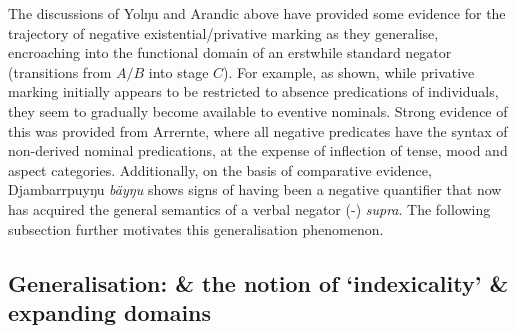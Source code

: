 \documentclass[usenames,dvipsnames,11pt]{article}
\begin{document}
{The discussions of Yolŋu and Arandic above have provided some evidence for the trajectory of negative existential/privative marking as they generalise, encroaching into the functional domain of an erstwhile standard negator (transitions from $A/B$ into stage $C$). For example, as shown, while privative marking initially appears to be restricted to absence predications of individuals, they seem to gradually become available to eventive nominals. Strong evidence of this was provided from Arrernte, where all negative predicates have the syntax of non-derived nominal predications, at the expense of inflection of tense, mood and aspect categories. Additionally, on the basis of comparative evidence, Djambarrpuyŋu \textit{bäyŋu} shows signs of having been a negative quantifier that now has acquired the general semantics of a verbal negator (-) \textit{supra}. The following subsection further motivates this generalisation phenomenon. 


\subsection{Generalisation: \& the notion of `indexicality' \& expanding domains}

}
\end{document}
